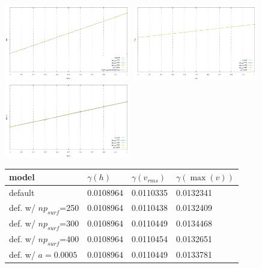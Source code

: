 \begin{center}
\includegraphics[width=5.5cm]{python_codes/fieldstone_95/results/growth_rate}
\includegraphics[width=5.5cm]{python_codes/fieldstone_95/results/growth_rate_vrms}
\includegraphics[width=5.5cm]{python_codes/fieldstone_95/results/growth_rate_maxv}
\end{center}


\begin{center}
\begin{tabular}{llll}
\hline
model    & $\gamma(h)$ & $\gamma(v_{rms})$ & $\gamma(\max(v))$ \\
\hline
\hline
default                 & 0.0108964 & 0.0110335& 0.0132341 \\
def. w/ $np_{surf}$=250 & 0.0108964 & 0.0110438& 0.0132409\\
def. w/ $np_{surf}$=300 & 0.0108964 & 0.0110449& 0.0134468\\
def. w/ $np_{surf}$=400 & 0.0108964 & 0.0110454& 0.0132651\\  
def. w/ $a=0.0005$      & 0.0108964 & 0.0110449& 0.0133781\\
\hline
\end{tabular}
\end{center}



